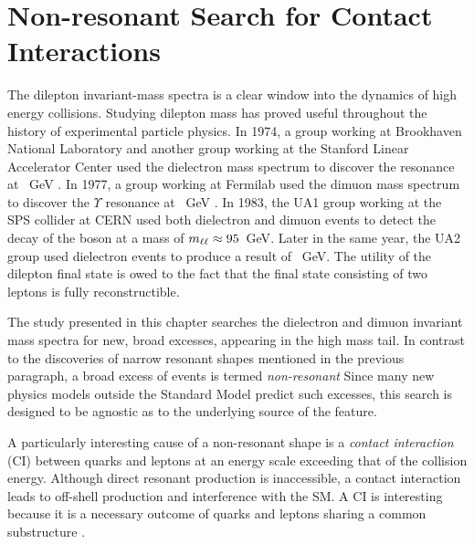 \chapter{Non-resonant Search for Contact Interactions}\label{sec:ci}

The dilepton invariant-mass spectra is a clear window into the dynamics of high energy collisions.
Studying dilepton mass has proved useful throughout the history of experimental particle physics.
In 1974, a group working at Brookhaven National Laboratory and another group working at the Stanford Linear Accelerator Center used the dielectron mass spectrum to discover the \jpsi resonance at ~GeV \cite{jpsiBnl}\cite{jpsiSlac}.
In 1977, a group working at Fermilab used the dimuon mass spectrum to discover the $\Upsilon$ resonance at ~GeV \cite{upsilon}.
In 1983, the UA1 group working at the SPS collider at CERN used both dielectron and dimuon events to detect the decay of the \Z boson at a mass of $m_{\ell\ell}\approx95$~GeV\cite{z0ua1}.
Later in the same year, the UA2 group used dielectron events to produce a result of ~GeV.
The utility of the dilepton final state is owed to the fact that the final state consisting of two leptons is fully reconstructible.

The study presented in this chapter searches the dielectron and dimuon invariant mass spectra for new, broad excesses, appearing in the high mass tail.
In contrast to the discoveries of narrow resonant shapes mentioned in the previous paragraph, a broad excess of events is termed \emph{non-resonant}
Since many new physics models outside the Standard Model predict such excesses, this search is designed to be agnostic as to the underlying source of the feature.

A particularly interesting cause of a non-resonant shape is a \emph{contact interaction} (CI) between quarks and leptons at an energy scale exceeding that of the collision energy.
Although direct resonant production is inaccessible, a contact interaction leads to off-shell production and interference with the SM.
A \qqll CI is interesting because it is a necessary outcome of quarks and leptons sharing a common substructure \cite{eichten}.

